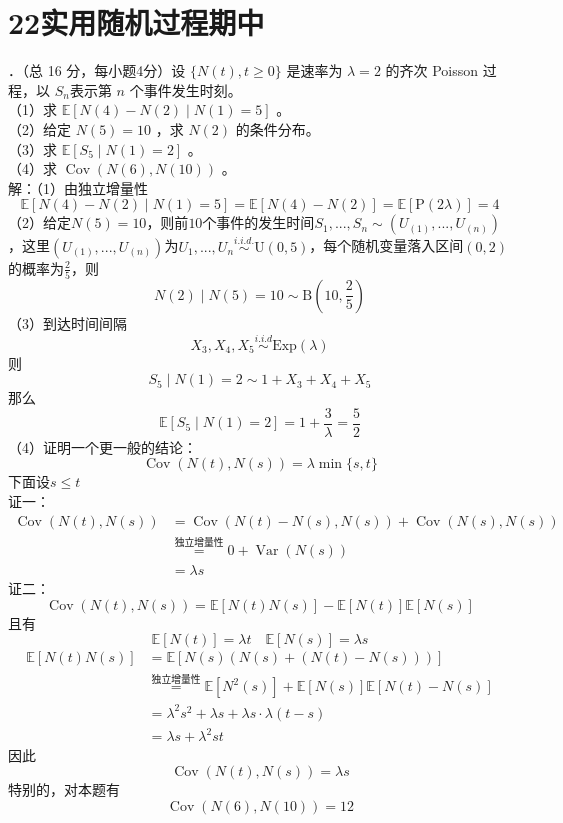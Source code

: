 \documentclass[UTF8,openany]{book}
\begin{document}
\section{\centering 22实用随机过程期中}
．（总 16 分，每小题4分）设 $\{N(t), t \geqslant 0\}$ 是速率为 $\lambda=2$ 的齐次 Poisson 过程，以 $S_{n}$表示第 $n$ 个事件发生时刻。\\
（1）求 $\mathbb{E}[N(4)-N(2) \mid N(1)=5]$ 。\\
（2）给定 $N(5)=10$ ，求 $N(2)$ 的条件分布。\\
（3）求 $\mathbb{E}\left[S_{5} \mid N(1)=2\right]$ 。\\
（4）求 $\operatorname{Cov}(N(6), N(10))$ 。\\
解：（1）由独立增量性
$$
\mathbb{E}[N(4)-N(2) \mid N(1)=5]=\mathbb{E}[N(4)-N(2)]=\mathbb{E}[\mathrm{P}(2\lambda)]=4
$$
（2）给定$N(5)=10$，则前$10$个事件的发生时间$S_1,...,S_n \sim (U_{(1)},...,U_{(n)})$，这里$(U_{(1)},...,U_{(n)})$为$U_1,...,U_n\stackrel{i.i.d.}{\sim}\mathrm{U}(0,5)$，每个随机变量落入区间$(0,2)$的概率为$\frac{2}{5}$，则
\[
N(2)\mid N(5)=10 \sim \mathrm{B}\left (10,\frac{2}{5}\right )
\]
（3）到达时间间隔
\[
X_3,X_4,X_5\stackrel{i.i.d}{\sim} \mathrm{Exp}(\lambda)
\]
则
\[
S_{5} \mid N(1)=2 \sim 1+X_3+X_4+X_5
\]
那么
\[
\mathbb{E}\left[S_{5} \mid N(1)=2\right]=1+\frac{3}{\lambda}=\frac{5}{2}
\]
（4）证明一个更一般的结论：
\[
\operatorname{Cov}\left(N(t),N(s) \right)=\lambda \min \{s,t\} 
\]
下面设$s\le t$\\
证一：
\begin{align*}
	\operatorname{Cov}\left(N(t),N(s) \right) &= \operatorname{Cov}\left(N(t)-N(s),N(s) \right)+\operatorname{Cov}\left(N(s),N(s) \right)   \\
	&\stackrel{\text{独立增量性}}{=}0+\operatorname{Var}\left(N(s) \right) \\
	&=\lambda s
\end{align*}
证二：
\[
\operatorname{Cov}\left(N(t),N(s) \right)=\mathbb{E}\left[N(t)N(s) \right]-\mathbb{E}[N(t)]\mathbb{E}[N(s)] 
\]
且有
\[
\mathbb{E}[N(t)]=\lambda t \quad \mathbb{E}[N(s)]=\lambda s
\]
\begin{align*}
	\mathbb{E}\left[N(t)N(s) \right] & =\mathbb{E}\left[N(s)\left(N(s)+\left(N(t)-N(s) \right)  \right)  \right] \\
	& \stackrel{\text{独立增量性}}{=} \mathbb{E}\left[N^2(s) \right]+\mathbb{E}[N(s)]\mathbb{E}[N(t)-N(s)]\\
	&= \lambda^2 s^2+\lambda s + \lambda s \cdot \lambda(t-s)\\
	&=\lambda s +\lambda^2 st
\end{align*}
因此
\[
\operatorname{Cov}\left(N(t),N(s) \right)=\lambda s
\]
特别的，对本题有
\[
\operatorname{Cov}(N(6),N(10))=12
\]\\
\end{document}

